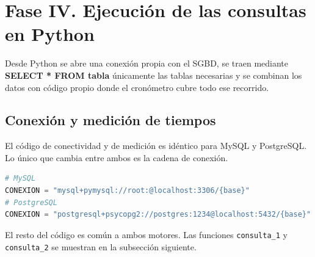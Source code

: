 \documentclass[11pt,a4paper]{article}
\begin{document}
\section{Fase IV. Ejecución de las consultas en Python}
\label{sec:fase4}

Desde Python se abre una conexión propia con el SGBD, se traen mediante
\textbf{SELECT * FROM tabla} únicamente las tablas necesarias y se combinan los datos
con código propio donde el cronómetro cubre todo ese recorrido.

\subsection{Conexión y medición de tiempos}

El código de conectividad y de medición es idéntico para MySQL y PostgreSQL. Lo único
que cambia entre ambos es la cadena de conexión.

\begin{lstlisting}[language=Python,caption={Comparación de las conexiones entre los SGBD.},label={lst:conexion-cambia}]
# MySQL
CONEXION = "mysql+pymysql://root:@localhost:3306/{base}"
# PostgreSQL
CONEXION = "postgresql+psycopg2://postgres:1234@localhost:5432/{base}"
\end{lstlisting}

El resto del código es común a ambos motores. Las funciones \texttt{consulta\_1} y
\texttt{consulta\_2} se muestran en la subsección siguiente.
\end{document}
